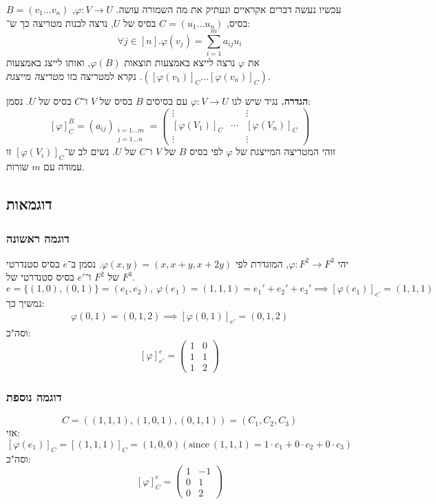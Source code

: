 \documentclass[]{article}
\newcommand\co        {\colon}
\renewcommand\phi     {\varphi}
\begin{document}
	עכשיו נעשה דברים אקראיים ונעתיק את מה השמורה עושה. $\phi \co V \to U$, $B = (v_1 \dots v_n)$ בסיס, $C = (u_1 \dots u_n)$ בסיס של $U$, נרצה לבנות מטריצה כך ש־: 
	\[ \forall j \in [n]. \phi(v_j) = \sum_{i = 1}^{m}a_{ij}u_i \]
	את $\phi$ נרצה לייצא באמצעות תוצאות $\phi(B)$, ואותו לייצג באמצעות $([\phi(v_1)]_C \dots [\phi(v_n)]_C)$. נקרא למטריצה כזו \textit{מטריצה מייצגת}. 
	
	\textbf{הגדרה. }נגיד שיש לנו $\phi \co V \to U$ עם בסיסים $B$ בסיס של $V$ ו־$C$ בסיס של $U$. נסמן: 
	\[ [\phi]_C^B = (a_{ij})_{\begin{aligned}
			\scriptstyle i =1 \dots m \\
			\scriptstyle j = 1 \dots n
	\end{aligned}} = \begin{pmatrix}
	\vdots & & \vdots \\
	[\phi(V_1)]_C & \cdots &  [\phi(V_n)]_C \\
	\vdots &  & \vdots
\end{pmatrix} \]
זוהי המטריצה המייצגת של $\phi$ לפי בסיס $B$ של $V$ ו־$C$ של $U$. 
	נשים לב ש־$[\phi(V_i)]_C$ זו עמודה עם $m$ שורות. 
	
	\subsection{דוגמאות}
	\subsubsection{דוגמה ראשונה}
	יהי $\phi \co F^2 \to F^3$, המוגדרת לפי $\phi(x, y) = (x, x + y, x + 2y)$. נסמן ב־$e$ בסיס סטנדרטי של $F^2$ ו־$e'$ בסיס סטנדרטי של $F^3$. 
	\[ e =\{(1, 0), (0, 1)\} = (e_1, e_2), \ \phi(e_1) = (1, 1, 1) = e_1' + e_2' + e_3' \implies [\phi(e_1)]_{e'} = (1, 1, 1) \]
	נמשיך כך: 
	\begin{gather}
		\phi(0, 1) = (0, 1, 2) \implies [\phi(0, 1)]_{e'} = (0, 1, 2)
	\end{gather}
	וסה"כ: 
	\[ [\phi]_{e'}^e = \begin{pmatrix}
		1 & 0 \\ 1 & 1 \\ 1 & 2
	\end{pmatrix} \]
	
	\subsubsection{דוגמה נוספת}
	\[ C = ((1, 1, 1), (1, 0, 1), (0, 1, 1)) = (C_1, C_2, C_3) \]
	אזי: 
	\[ [\phi(e_1)]_C = [(1, 1, 1)]_C = (1, 0, 0) (\text{since} \ (1, 1, 1) = 1 \cdot c_1 + 0 \cdot c_2 + 0 \cdot c_3) \]
	וסה"כ: 
	\[ [\phi]_C^e = \begin{pmatrix}
		1 & -1 \\ 0 & 1 \\ 0 & 2
	\end{pmatrix} \]
	
\end{document}
